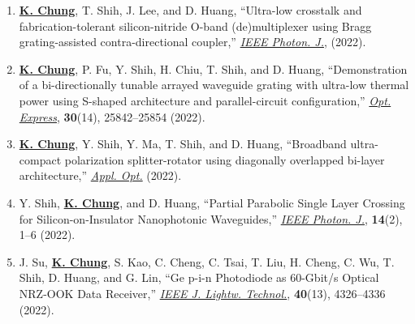     \begin{enumerate}
        \justifying 
        \item \underline{\textbf{K. Chung}}, T. Shih, J. Lee, and D. Huang, ``Ultra-low crosstalk and fabrication-tolerant silicon-nitride O-band (de)multiplexer using Bragg grating-assisted contra-directional coupler,'' \href{https://doi.org/10.1109/JPHOT.2022.3209169}{\textit{IEEE Photon. J.}}, (2022).%
        
        \item \underline{\textbf{K. Chung}}, P. Fu, Y. Shih, H. Chiu, T. Shih, and D. Huang, ``Demonstration of a bi-directionally tunable arrayed waveguide grating with ultra-low thermal power using S-shaped architecture and parallel-circuit configuration,'' \href{https://doi.org/10.1364/OE.462636}{\textit{Opt. Express}}, \textbf{30}(14), 25842--25854 (2022).
        
        \item \underline{\textbf{K. Chung}}, Y. Shih, Y. Ma, T. Shih, and D. Huang, ``Broadband ultra-compact polarization splitter-rotator using diagonally overlapped bi-layer architecture,'' \href{https://doi.org/10.1364/AO.470750}{\textit{Appl. Opt.}} (2022).
        
        \item Y. Shih, \underline{\textbf{K. Chung}}, and D. Huang, ``Partial Parabolic Single Layer Crossing for Silicon-on-Insulator Nanophotonic Waveguides,'' \href{https://doi.org/10.1109/JPHOT.2022.3152923}{\textit{IEEE Photon. J.}}, \textbf{14}(2), 1--6 (2022).
        
        \item J. Su, \underline{\textbf{K. Chung}}, S. Kao, C. Cheng, C. Tsai, T. Liu, H. Cheng, C. Wu, T. Shih, D. Huang, and G. Lin, ``Ge p-i-n Photodiode as 60-Gbit/s Optical NRZ-OOK Data Receiver,'' \href{https://doi.org/10.1109/JLT.2022.3161011}{\textit{IEEE J. Lightw. Technol.}}, \textbf{40}(13), 4326--4336 (2022).

    \end{enumerate}

